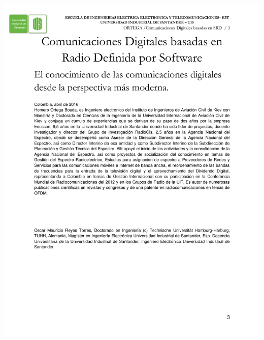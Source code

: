 \newpage
\begin{center}
\pagestyle{plain}
\includegraphics[trim = 1mm 19mm 19mm 1mm, clip,width=\textwidth]{Imagenes/Autores}%
\par
\end{center}